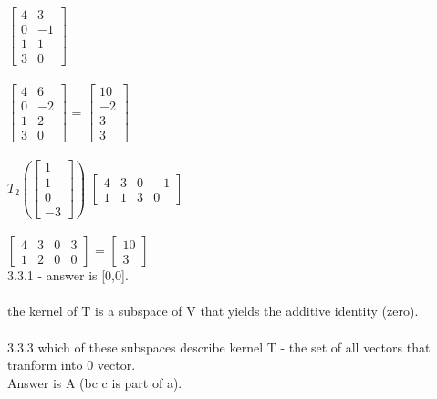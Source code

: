 \documentclass{article}
\begin{document}
$\left[\begin{matrix}
4 & 3 \\0 & -1 \\1 & 1\\3 & 0
\end{matrix}\right]$\\
\\
$\left[\begin{matrix}
4 & 6 \\0 & -2 \\1 & 2\\3 & 0
\end{matrix}\right]$ = 
$\left[\begin{matrix}
10 \\ -2 \\3\\3 \end{matrix}\right]$\\
\\
$T_{2} \left( \left[ \begin{matrix} 
1\\1\\0\\-3 
\end{matrix} \right] \right)$ 
$\left[\begin{matrix}
4 & 3 & 0 & -1 \\1 & 1 & 3 & 0
\end{matrix}\right]$\\
\\
$\left[\begin{matrix}
4 & 3 & 0 & 3 \\1 & 2 & 0 & 0 
\end{matrix}\right]$ = 
$\left[\begin{matrix}
10 \\3
\end{matrix}\right]$
\\
3.3.1 - answer is [0,0].\\
\\
the kernel of T is a subspace of V that yields the additive identity (zero).\\
\\
3.3.3 which of these subspaces describe kernel T - the set of all vectors that tranform into 0 vector.\\
Answer is A (bc c is part of a).\\
\\
\end{document}
